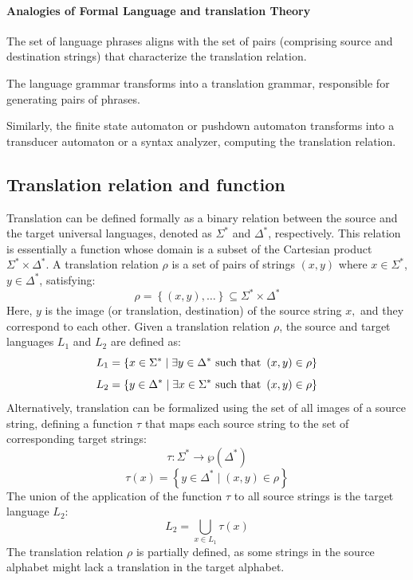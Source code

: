 \paragraph*{Analogies of Formal Language and translation Theory}
The set of language phrases aligns with the set of pairs (comprising source and destination strings) that characterize the translation relation.

The language grammar transforms into a translation grammar, responsible for generating pairs of phrases.

Similarly, the finite state automaton or pushdown automaton transforms into a transducer automaton or a syntax analyzer, computing the translation relation.

\subsection{Translation relation and function}
Translation can be defined formally as a binary relation between the source and the target universal languages, denoted as $\Sigma^{\ast}$ and $\Delta^{\ast}$, respectively. 
This relation is essentially a function whose domain is a subset of the Cartesian product $\Sigma^{\ast} \times \Delta^{\ast}$.
A translation relation $\rho$ is a set of pairs of strings $\left( x, y \right)$ where $x \in \Sigma^{\ast}$, $y \in \Delta^{\ast}$, satisfying:
\[ \rho = \left\{ \left( x, y \right),\dots \right\} \subseteq \Sigma^{\ast} \times \Delta^{\ast} \]
Here, $y$ is the image (or translation, destination) of the source string $x, $ and they correspond to each other.
Given a translation relation $\rho$, the source and target languages $L_1$ and $L_2$ are defined as:
\[L_1 = \left\{ x \in \Sigma^{\ast} \mid  \exists y \in \Delta^{\ast} \textnormal{ such that } \left( x, y \right) \in \rho \right\}\]
\[L_2 = \left\{ y \in \Delta^{\ast} \mid  \exists x \in \Sigma^{\ast} \textnormal{ such that } \left( x, y \right) \in \rho \right\}\]
Alternatively, translation can be formalized using the set of all images of a source string, defining a function $\tau$ that maps each source string to the set of corresponding target strings:
\[\tau: \Sigma^{\ast} \rightarrow \wp \left( \Delta^{\ast} \right)\]
\[\tau(x) = \left\{ y \in \Delta^{\ast} \mid  \left( x, y \right) \in \rho \right\}\]
The union of the application of the function $\tau$ to all source strings is the target language $L_2$:
\[ L_2 = \bigcup_{x \in L_1} \tau(x) \]
The translation relation $\rho$ is partially defined, as some strings in the source alphabet might lack a translation in the target alphabet.
